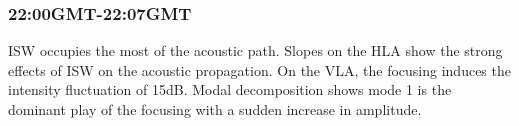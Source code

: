 \subsubsection{22:00GMT-22:07GMT}
ISW occupies the most of the acoustic path. Slopes on the HLA show
the strong effects of ISW on the acoustic propagation. On the VLA,
the focusing induces the intensity fluctuation of 15dB. Modal
decomposition shows mode 1 is the dominant play of the focusing with
a sudden increase in amplitude.
